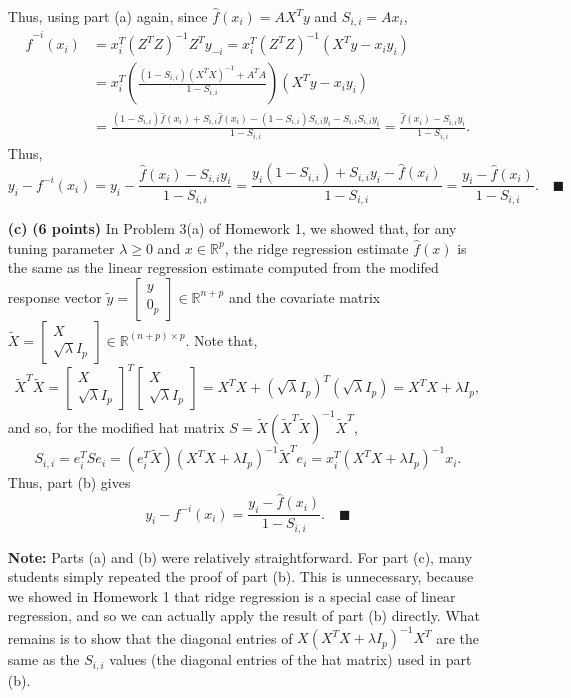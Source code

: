 \documentclass[12pt]{article}
\renewcommand{\qed}{\quad \ensuremath{\blacksquare}}    %
\newcommand{\inv}{^{-1}}                            %
\newcommand{\R}{\mathbb{R}}                         %
\newcommand{\wt}{\widetilde}
\renewcommand{\hat}{\widehat}
\newcommand{\1}{\mathbbm{1}}
\begin{document}
\begin{enumerate}
Thus, using part (a) again, since $\hat f(x_i) = A X^T y$ and
$S_{i,i} = A x_i$,
\begin{align*}
\hat f^{-i}(x_i)
 &  = x_i^T (Z^T Z)\inv Z^T y_{-i}
    = x_i^T (Z^T Z)\inv \left( X^T y - x_i y_i \right)  \\
 &  = x_i^T \left( \frac{(1 - S_{i,i})(X^T X)\inv + A^T A}{1 - S_{i,i}} \right)
                                            \left( X^T y - x_i y_i \right)  \\
 &  = \frac{(1 - S_{i,i})\hat f(x_i) + S_{i,i} \hat f(x_i)
            - (1 - S_{i,i})S_{i,i} y_i - S_{i,i} S_{i,i} y_i}{1 - S_{i,i}}
    = \frac{\hat f(x_i) - S_{i,i} y_i}{1 - S_{i,i}}.
\end{align*}
Thus,
\[y_i - f^{-i}(x_i)
    = y_i - \frac{\hat f(x_i) - S_{i,i} y_i}{1 - S_{i,i}}
    = \frac{y_i(1 - S_{i,i}) + S_{i,i} y_i - \hat f(x_i)}{1 - S_{i,i}}
    = \frac{y_i - \hat f(x_i)}{1 - S_{i,i}}. \qed\]

\item[{\bf (c)}] {\bf (6 points)} In Problem 3(a) of Homework 1, we showed
that, for any tuning parameter $\lambda \geq 0$ and $x \in \R^p$, the ridge
regression estimate $\hat f(x)$ is the same as the linear regression estimate
computed from the modifed response vector
$\wt y = \begin{bmatrix} y \\ 0_p \end{bmatrix} \in \R^{n + p}$
and the covariate matrix
$\wt X = \begin{bmatrix} X \\
    \sqrt\lambda I_p \end{bmatrix} \in \R^{(n + p) \times p}$.
Note that,
\[\wt X^T \wt X
    = \begin{bmatrix} X \\ \sqrt\lambda I_p \end{bmatrix}^T
        \begin{bmatrix} X \\ \sqrt\lambda I_p \end{bmatrix}
    = X^T X + \left( \sqrt\lambda I_p \right)^T \left( \sqrt\lambda I_p \right)
    = X^T X + \lambda I_p,\]
and so, for the modified hat matrix $S = \wt X (\wt X^T \wt X)\inv \wt X^T$,
\[S_{i,i}
    = e_i^T S e_i
    = (e_i^T \wt X) \left( X^T X + \lambda I_p \right)\inv \wt X^T e_i
    = x_i^T \left( X^T X + \lambda I_p \right)\inv x_i.
\]
Thus, part (b) gives
\[y_i - f^{-i}(x_i) = \frac{y_i - \hat f(x_i)}{1 - S_{i,i}}. \qed\]

{\bf Note:} Parts (a) and (b) were relatively straightforward. For part (c),
many students simply repeated the proof of part (b). This is unnecessary,
because we showed in Homework 1 that ridge regression is a special case of
linear regression, and so we can actually apply the result of part (b)
directly. What remains is to show that the diagonal entries of
$X (X^T X + \lambda I_p)\inv X^T$ are the same as the $S_{i,i}$ values (the
diagonal entries of the hat matrix) used in part (b).
\end{enumerate}
\end{document}
